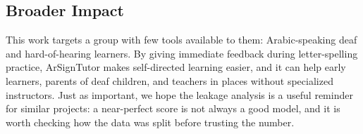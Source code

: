 \subsection{Broader Impact}
This work targets a group with few tools available to them: Arabic-speaking deaf and
hard-of-hearing learners. By giving immediate feedback during letter-spelling
practice, ArSignTutor makes self-directed learning easier, and it can help early
learners, parents of deaf children, and teachers in places without specialized
instructors. Just as important, we hope the leakage analysis is a useful reminder for
similar projects: a near-perfect score is not always a good model, and it is worth
checking how the data was split before trusting the number.
